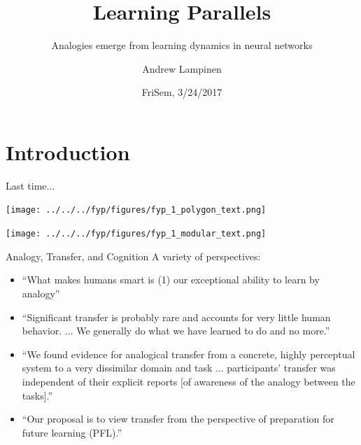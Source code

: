 \documentclass{beamer}
\begin{document}
\title{Learning Parallels}
\subtitle{Analogies emerge from learning dynamics in neural networks}
\author{Andrew Lampinen}
\date{FriSem, 3/24/2017}
\frame{\titlepage}


\section{Introduction}
\begin{frame}{Last time...}
\begin{center}
\texttt{[image: ../../../fyp/figures/fyp\_1\_polygon\_text.png]}
\end{center}
\begin{center}
\texttt{[image: ../../../fyp/figures/fyp\_1\_modular\_text.png]}
\end{center}
\end{frame}


\begin{frame}{Analogy, Transfer, and Cognition}
A variety of perspectives:
\begin{itemize}
    \item<1-> ``What makes humans smart is (1) our exceptional ability to learn by analogy'' \cite{Gentner2003} 
    \item<2-> ``Significant transfer is probably rare and accounts for very little human behavior. ... We generally do what we have learned to do and no more.'' \cite{Detterman1993}
    \item<3-> ``We found evidence for analogical transfer from a concrete, highly perceptual system to a very dissimilar domain and task ... participants' transfer was independent of their explicit reports [of awareness of the analogy between the tasks].'' \cite{Day2011}
    \item<4-> ``Our proposal is to view transfer from the perspective of preparation for future learning (PFL).'' \cite{Bransford1999} 
\end{itemize}
\end{frame}
\end{document}
